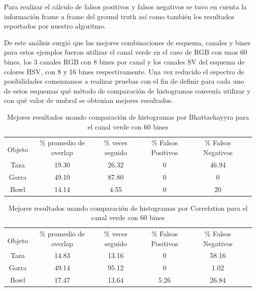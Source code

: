 Para realizar el cálculo de falsos positivos y falsos negativos se tuvo en cuenta la información frame a frame del ground truth así como también los resultados reportados por nuestro algoritmo.

De este análisis surgió que las mejores combinaciones de esquema, canales y bines para estos ejemplos fueron utilizar el canal verde en el caso de RGB con unos 60 bines, los 3 canales RGB con 8 bines por canal y los canales SV del esquema de colores HSV, con 8 y 16 bines respectivamente. Una vez reducido el espectro de posibilidades comenzamos a realizar pruebas con el fin de definir para cada uno de estos esquemas qué método de comparación de histogramas convenía utilizar y con qué valor de umbral se obtenian mejores resultados.

\begin{table}[h]
	\centering
	\begin{tabular}{|c|c|c|c|c|c|}
	    \hline
	    & \multirow{2}{2.4cm}{\% promedio de overlap} & \multirow{2}{2cm}{\% veces seguido} & \multirow{2}{1.6cm}{\% Falsos Positivos} & \multirow{2}{1.6cm}{\% Falsos Negativos}\\
		Objeto & & & &\\
	    \hline
	    Taza   & 19.30      & 26.32   & 0       & 46.94 \\
	    \hline
	    Gorra  & 49.10      & 87.80   & 0       & 0     \\
	    \hline
	    Bowl   & 14.14      &  4.55   & 0       & 20    \\
	    \hline
    \end{tabular}
	\caption{Mejores resultados usando comparación de histogramas por Bhattachayyra para el canal verde con 60 bines}
	\label{pruebas_definitivas_bhatta_green}
\end{table}

\begin{table}[h]
	\centering
	\begin{tabular}{|c|c|c|c|c|c|}
	    \hline
	    & \multirow{2}{2.4cm}{\% promedio de overlap} & \multirow{2}{2cm}{\% veces seguido} & \multirow{2}{1.6cm}{\% Falsos Positivos} & \multirow{2}{1.6cm}{\% Falsos Negativos}\\
		Objeto & & & &\\
	    \hline
	    Taza   & 14.83      & 13.16     & 0      & 58.16 \\
	    \hline
	    Gorra  & 49.14      & 95.12     & 0      & 1.02  \\
	    \hline
	    Bowl   & 17.47      & 13.64     & 5.26   & 26.84 \\
	    \hline
    \end{tabular}
	\caption{Mejores resultados usando comparación de histogramas por Correlation para el canal verde con 60 bines}
	\label{pruebas_definitivas_correl_green}
\end{table}

